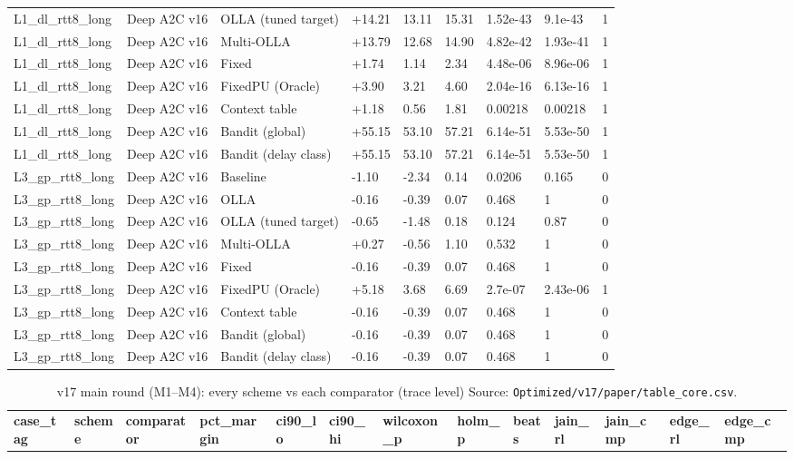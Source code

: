\documentclass[10pt]{article}
\begin{document}
\begin{landscape}
\begin{longtable}{@{}lllllllll@{}}
L1\_dl\_rtt8\_long & Deep A2C v16 & OLLA (tuned target) & +14.21 & 13.11 & 15.31 & 1.52e-43 & 9.1e-43 & 1 \\
L1\_dl\_rtt8\_long & Deep A2C v16 & Multi-OLLA & +13.79 & 12.68 & 14.90 & 4.82e-42 & 1.93e-41 & 1 \\
L1\_dl\_rtt8\_long & Deep A2C v16 & Fixed & +1.74 & 1.14 & 2.34 & 4.48e-06 & 8.96e-06 & 1 \\
L1\_dl\_rtt8\_long & Deep A2C v16 & FixedPU (Oracle) & +3.90 & 3.21 & 4.60 & 2.04e-16 & 6.13e-16 & 1 \\
L1\_dl\_rtt8\_long & Deep A2C v16 & Context table & +1.18 & 0.56 & 1.81 & 0.00218 & 0.00218 & 1 \\
L1\_dl\_rtt8\_long & Deep A2C v16 & Bandit (global) & +55.15 & 53.10 & 57.21 & 6.14e-51 & 5.53e-50 & 1 \\
L1\_dl\_rtt8\_long & Deep A2C v16 & Bandit (delay class) & +55.15 & 53.10 & 57.21 & 6.14e-51 & 5.53e-50 & 1 \\
L3\_gp\_rtt8\_long & Deep A2C v16 & Baseline & -1.10 & -2.34 & 0.14 & 0.0206 & 0.165 & 0 \\
L3\_gp\_rtt8\_long & Deep A2C v16 & OLLA & -0.16 & -0.39 & 0.07 & 0.468 & 1 & 0 \\
L3\_gp\_rtt8\_long & Deep A2C v16 & OLLA (tuned target) & -0.65 & -1.48 & 0.18 & 0.124 & 0.87 & 0 \\
L3\_gp\_rtt8\_long & Deep A2C v16 & Multi-OLLA & +0.27 & -0.56 & 1.10 & 0.532 & 1 & 0 \\
L3\_gp\_rtt8\_long & Deep A2C v16 & Fixed & -0.16 & -0.39 & 0.07 & 0.468 & 1 & 0 \\
L3\_gp\_rtt8\_long & Deep A2C v16 & FixedPU (Oracle) & +5.18 & 3.68 & 6.69 & 2.7e-07 & 2.43e-06 & 1 \\
L3\_gp\_rtt8\_long & Deep A2C v16 & Context table & -0.16 & -0.39 & 0.07 & 0.468 & 1 & 0 \\
L3\_gp\_rtt8\_long & Deep A2C v16 & Bandit (global) & -0.16 & -0.39 & 0.07 & 0.468 & 1 & 0 \\
L3\_gp\_rtt8\_long & Deep A2C v16 & Bandit (delay class) & -0.16 & -0.39 & 0.07 & 0.468 & 1 & 0 \\
\bottomrule
\end{longtable}
\normalsize
\tiny
\setlength{\tabcolsep}{2pt}
\begin{longtable}{@{}lllllllllllll@{}}
\caption{v17 main round (M1--M4): every scheme vs each comparator (trace level) Source: \texttt{Optimized/v17/paper/table\_core.csv}.}\\
\toprule
\textbf{case\_tag} & \textbf{scheme} & \textbf{comparator} & \textbf{pct\_margin} & \textbf{ci90\_lo} & \textbf{ci90\_hi} & \textbf{wilcoxon\_p} & \textbf{holm\_p} & \textbf{beats} & \textbf{jain\_rl} & \textbf{jain\_cmp} & \textbf{edge\_rl} & \textbf{edge\_cmp} \\

\end{longtable}
\end{landscape}
\end{document}
